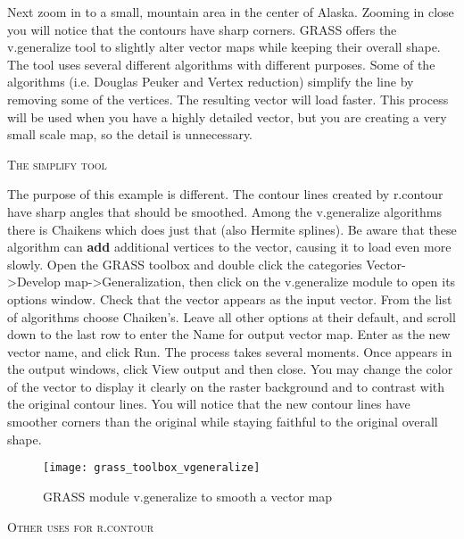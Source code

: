 Next zoom in to a small, mountain area in the center of Alaska. Zooming in close you will notice that the contours have sharp corners. GRASS offers the v.generalize tool to slightly alter vector maps while keeping their overall shape. The tool uses several different algorithms with different purposes. Some of the algorithms (i.e. Douglas Peuker and Vertex reduction) simplify the line by removing some of the vertices. The resulting vector will load faster. This process will be used when you have a highly detailed vector, but you are creating a very small scale map, so the detail is unnecessary. 
\begin{Tip}\caption{\textsc{The simplify tool}}
\end{Tip}  
The purpose of this example is different. The contour lines created by r.contour have sharp angles that should be smoothed.  Among the v.generalize algorithms there is Chaikens which does just that (also Hermite splines). Be aware that these algorithm can \textbf{add}  additional vertices to the vector, causing it to load even more slowly.
Open the GRASS toolbox and double click the categories Vector->Develop map->Generalization, then click on the v.generalize module to open its options window. Check that the  vector appears as the input vector. From the list of algorithms choose Chaiken's. Leave all other options at their default, and scroll down to the last row to enter the Name for output vector map. Enter  as the new vector name, and click Run. The process takes several moments.  Once  appears in the output windows, click View output and then close. You may change the color of the vector to display it clearly on the raster background and to contrast with the original contour lines. You will notice that the new contour lines have smoother corners than the original while staying faithful to the original overall shape.
\begin{figure}[h]
 \begin{center}
 \caption{GRASS module v.generalize to smooth a vector map \nixcaption}\label{fig:grass_toolbox_vgeneralize}
 \texttt{[image: grass\_toolbox\_vgeneralize]}
 \end{center}
\end{figure}

\begin{Tip}\caption{\textsc{Other uses for r.contour}}
\end{Tip}  

